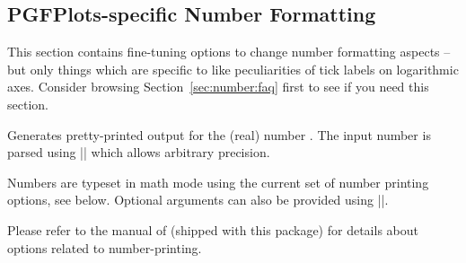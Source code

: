 \subsection{PGFPlots-specific Number Formatting}

This section contains fine-tuning options to change number formatting aspects
-- but only things which are specific to \PGFPlots{} like peculiarities of tick
labels on logarithmic axes. Consider browsing Section~\ref{sec:number:faq}
first to see if you need this section.

\begin{command}{\pgfmathprintnumber{}}
    Generates pretty-printed output for the (real) number . The input
    number  is parsed using |\pgfmathfloatparsenumber| which allows
    arbitrary precision.

    Numbers are typeset in math mode using the current set of number printing
    options, see below. Optional arguments can also be provided using
    ||.

    Please refer to the manual of \PGFPlotstable{} (shipped with this package)
    for details about options related to number-printing.
\end{command}

